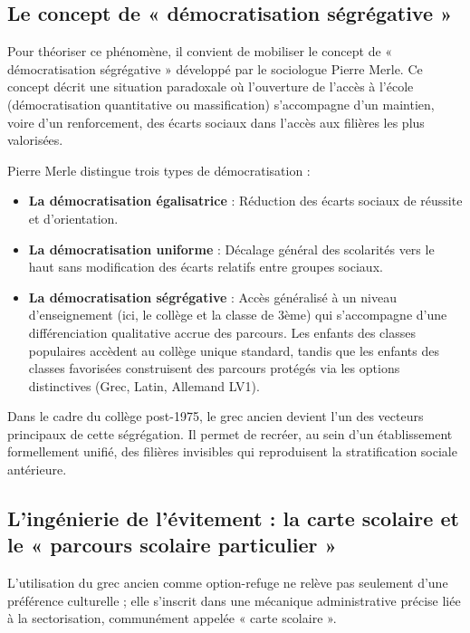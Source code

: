 \subsection{Le concept de « démocratisation ségrégative »}

Pour théoriser ce phénomène, il convient de mobiliser le concept de « démocratisation ségrégative »
développé par le sociologue Pierre Merle. Ce concept décrit une situation paradoxale où l'ouverture
de l'accès à l'école (démocratisation quantitative ou massification) s'accompagne d'un maintien,
voire d'un renforcement, des écarts sociaux dans l'accès aux filières les plus
valorisées.\cite{I-3-1-ref8}

Pierre Merle distingue trois types de démocratisation :

\begin{itemize}\item \textbf{La démocratisation égalisatrice} : Réduction des écarts sociaux de réussite et d'orientation.\item \textbf{La démocratisation uniforme} : Décalage général des scolarités vers le haut sans modification des écarts relatifs entre groupes sociaux.\item \textbf{La démocratisation ségrégative} : Accès généralisé à un niveau d'enseignement (ici, le collège et la classe de 3ème) qui s'accompagne d'une différenciation qualitative accrue des parcours. Les enfants des classes populaires accèdent au collège unique \og standard\fg{}, tandis que les enfants des classes favorisées construisent des parcours protégés via les options distinctives (Grec, Latin, Allemand LV1).\cite{I-3-1-ref8}\end{itemize}Dans le cadre du collège post-1975, le grec ancien devient l'un des vecteurs principaux de cette
ségrégation. Il permet de recréer, au sein d'un établissement formellement unifié, des filières
invisibles qui reproduisent la stratification sociale antérieure.



\subsection{L'ingénierie de l'évitement : la carte scolaire et le « parcours scolaire particulier »}

L'utilisation du grec ancien comme option-refuge ne relève pas seulement d'une préférence culturelle
; elle s'inscrit dans une mécanique administrative précise liée à la sectorisation, communément
appelée « carte scolaire ».



